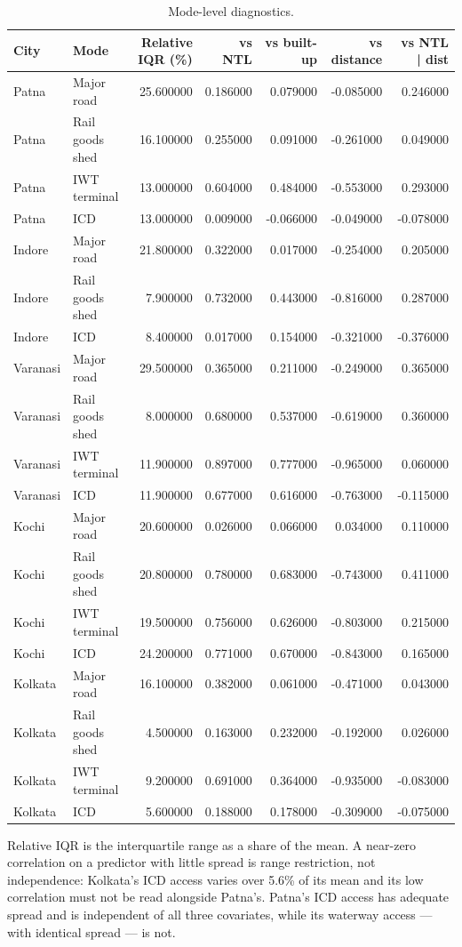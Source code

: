\begin{table}[htbp]
\centering
\small
\caption{Mode-level diagnostics.}
\label{tab:t12_mode_diagnostics}
\begin{tabular}{llrrrrr}
\toprule
City & Mode & Relative IQR (\%) & vs NTL & vs built-up & vs distance & vs NTL | dist \\
\midrule
Patna & Major road & 25.600000 & 0.186000 & 0.079000 & -0.085000 & 0.246000 \\
Patna & Rail goods shed & 16.100000 & 0.255000 & 0.091000 & -0.261000 & 0.049000 \\
Patna & IWT terminal & 13.000000 & 0.604000 & 0.484000 & -0.553000 & 0.293000 \\
Patna & ICD & 13.000000 & 0.009000 & -0.066000 & -0.049000 & -0.078000 \\
Indore & Major road & 21.800000 & 0.322000 & 0.017000 & -0.254000 & 0.205000 \\
Indore & Rail goods shed & 7.900000 & 0.732000 & 0.443000 & -0.816000 & 0.287000 \\
Indore & ICD & 8.400000 & 0.017000 & 0.154000 & -0.321000 & -0.376000 \\
Varanasi & Major road & 29.500000 & 0.365000 & 0.211000 & -0.249000 & 0.365000 \\
Varanasi & Rail goods shed & 8.000000 & 0.680000 & 0.537000 & -0.619000 & 0.360000 \\
Varanasi & IWT terminal & 11.900000 & 0.897000 & 0.777000 & -0.965000 & 0.060000 \\
Varanasi & ICD & 11.900000 & 0.677000 & 0.616000 & -0.763000 & -0.115000 \\
Kochi & Major road & 20.600000 & 0.026000 & 0.066000 & 0.034000 & 0.110000 \\
Kochi & Rail goods shed & 20.800000 & 0.780000 & 0.683000 & -0.743000 & 0.411000 \\
Kochi & IWT terminal & 19.500000 & 0.756000 & 0.626000 & -0.803000 & 0.215000 \\
Kochi & ICD & 24.200000 & 0.771000 & 0.670000 & -0.843000 & 0.165000 \\
Kolkata & Major road & 16.100000 & 0.382000 & 0.061000 & -0.471000 & 0.043000 \\
Kolkata & Rail goods shed & 4.500000 & 0.163000 & 0.232000 & -0.192000 & 0.026000 \\
Kolkata & IWT terminal & 9.200000 & 0.691000 & 0.364000 & -0.935000 & -0.083000 \\
Kolkata & ICD & 5.600000 & 0.188000 & 0.178000 & -0.309000 & -0.075000 \\
\bottomrule
\end{tabular}
\begin{tablenotes}\footnotesize
\item Relative IQR is the interquartile range as a share of the mean. A near-zero correlation on a predictor with little spread is range restriction, not independence: Kolkata's ICD access varies over 5.6\% of its mean and its low correlation must not be read alongside Patna's. Patna's ICD access has adequate spread and is independent of all three covariates, while its waterway access — with identical spread — is not.
\end{tablenotes}
\end{table}
